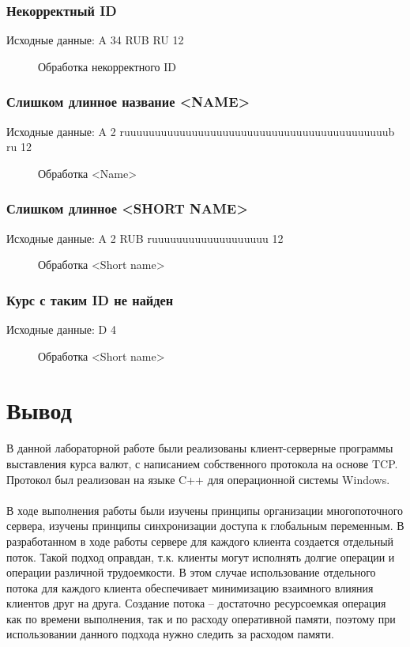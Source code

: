 \documentclass[a4paper,14pt]{article}
\begin{document}
\subsubsection {Некорректный ID}
Исходные данные: A 34 RUB RU 12
\begin{figure}[h!]
	\noindent\centering{
		\texttt{[image: 17]}}
	\caption{Обработка некорректного ID}
	\label{figCurves}
\end{figure}

\subsubsection {Слишком длинное название <NAME>}
Исходные данные: A 2 ruuuuuuuuuuuuuuuuuuuuuuuuuuuuuuuuuuuuuuuuuuub ru 12

\begin{figure}[h!]
	\noindent\centering{
		\texttt{[image: 10]}}
	\caption{Обработка <Name>}
	\label{figCurves}
\end{figure}

\subsubsection {Слишком длинное <SHORT NAME>}
Исходные данные: A 2 RUB ruuuuuuuuuuuuuuuuuuu 12

\begin{figure}[h!]
	\noindent\centering{
		\texttt{[image: 10]}}
	\caption{Обработка <Short name>}
	\label{figCurves}
\end{figure}

\subsubsection {Курс с таким ID не найден}
Исходные данные: D 4

\begin{figure}[h!]
	\noindent\centering{
		\texttt{[image: 14]}}
	\caption{Обработка <Short name>}
	\label{figCurves}
\end{figure}
\section{Вывод}
В данной лабораторной работе были реализованы клиент-серверные программы выставления курса валют, с написанием собственного протокола на основе TCP. Протокол был реализован на языке C++ для операционной системы Windows.\\\\
В ходе выполнения работы были изучены принципы организации многопоточного сервера, изучены принципы синхронизации доступа к глобальным переменным.
В разработанном в ходе работы сервере для каждого клиента создается отдельный поток. Такой подход оправдан, т.к. клиенты могут исполнять долгие операции и операции различной трудоемкости. В этом случае использование отдельного потока для каждого клиента обеспечивает минимизацию взаимного влияния клиентов друг на друга. Создание потока – достаточно ресурсоемкая операция как по времени выполнения, так и по расходу оперативной памяти, поэтому при использовании данного подхода нужно следить за расходом памяти. \\\\
\end{document}
